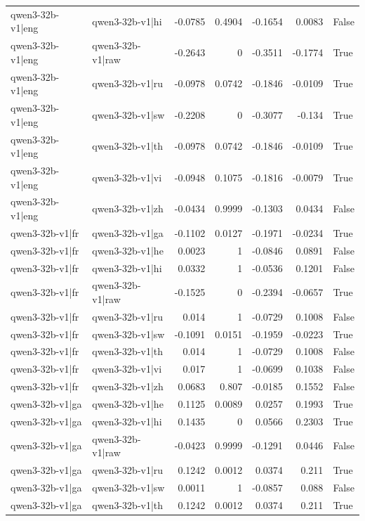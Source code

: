 \begin{table}
\begin{tabular}{l l r r r r l}
qwen3-32b-v1|eng & qwen3-32b-v1|hi & -0.0785 & 0.4904 & -0.1654 & 0.0083 & False \\
qwen3-32b-v1|eng & qwen3-32b-v1|raw & -0.2643 & 0 & -0.3511 & -0.1774 & True \\
qwen3-32b-v1|eng & qwen3-32b-v1|ru & -0.0978 & 0.0742 & -0.1846 & -0.0109 & True \\
qwen3-32b-v1|eng & qwen3-32b-v1|sw & -0.2208 & 0 & -0.3077 & -0.134 & True \\
qwen3-32b-v1|eng & qwen3-32b-v1|th & -0.0978 & 0.0742 & -0.1846 & -0.0109 & True \\
qwen3-32b-v1|eng & qwen3-32b-v1|vi & -0.0948 & 0.1075 & -0.1816 & -0.0079 & True \\
qwen3-32b-v1|eng & qwen3-32b-v1|zh & -0.0434 & 0.9999 & -0.1303 & 0.0434 & False \\
qwen3-32b-v1|fr & qwen3-32b-v1|ga & -0.1102 & 0.0127 & -0.1971 & -0.0234 & True \\
qwen3-32b-v1|fr & qwen3-32b-v1|he & 0.0023 & 1 & -0.0846 & 0.0891 & False \\
qwen3-32b-v1|fr & qwen3-32b-v1|hi & 0.0332 & 1 & -0.0536 & 0.1201 & False \\
qwen3-32b-v1|fr & qwen3-32b-v1|raw & -0.1525 & 0 & -0.2394 & -0.0657 & True \\
qwen3-32b-v1|fr & qwen3-32b-v1|ru & 0.014 & 1 & -0.0729 & 0.1008 & False \\
qwen3-32b-v1|fr & qwen3-32b-v1|sw & -0.1091 & 0.0151 & -0.1959 & -0.0223 & True \\
qwen3-32b-v1|fr & qwen3-32b-v1|th & 0.014 & 1 & -0.0729 & 0.1008 & False \\
qwen3-32b-v1|fr & qwen3-32b-v1|vi & 0.017 & 1 & -0.0699 & 0.1038 & False \\
qwen3-32b-v1|fr & qwen3-32b-v1|zh & 0.0683 & 0.807 & -0.0185 & 0.1552 & False \\
qwen3-32b-v1|ga & qwen3-32b-v1|he & 0.1125 & 0.0089 & 0.0257 & 0.1993 & True \\
qwen3-32b-v1|ga & qwen3-32b-v1|hi & 0.1435 & 0 & 0.0566 & 0.2303 & True \\
qwen3-32b-v1|ga & qwen3-32b-v1|raw & -0.0423 & 0.9999 & -0.1291 & 0.0446 & False \\
qwen3-32b-v1|ga & qwen3-32b-v1|ru & 0.1242 & 0.0012 & 0.0374 & 0.211 & True \\
qwen3-32b-v1|ga & qwen3-32b-v1|sw & 0.0011 & 1 & -0.0857 & 0.088 & False \\
qwen3-32b-v1|ga & qwen3-32b-v1|th & 0.1242 & 0.0012 & 0.0374 & 0.211 & True \\

\end{tabular}
\end{table}
